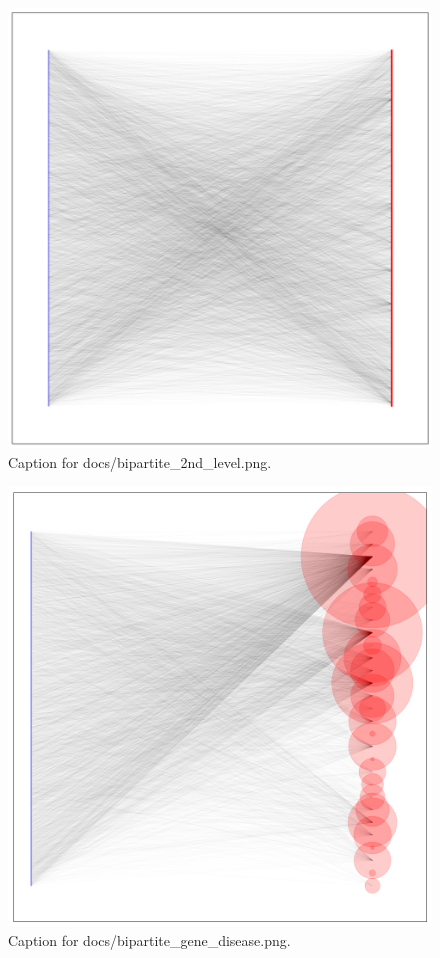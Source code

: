 \documentclass{article}
\begin{document}
\begin{figure}[h] \centering \includegraphics{docs/bipartite_2nd_level.png} \caption{Caption for docs/bipartite_2nd_level.png.} \end{figure}
\begin{figure}[h] \centering \includegraphics{docs/bipartite_gene_disease.png} \caption{Caption for docs/bipartite_gene_disease.png.} \end{figure}
\end{document}
